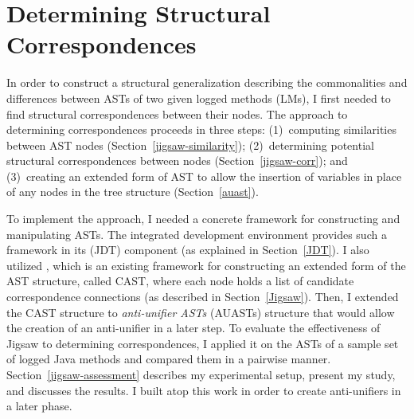 \chapter{Determining Structural Correspondences}\label{background2}
In order to construct a structural generalization describing the commonalities and differences between ASTs of two given logged methods (LMs), I first needed to find structural correspondences between their nodes. The approach to determining correspondences proceeds in three steps: (1)~computing similarities between AST nodes (Section~\ref{jigsaw-similarity}); (2)~determining potential structural correspondences between nodes (Section~\ref{jigsaw-corr}); and (3)~creating an extended form of AST to allow the insertion of variables in place of any nodes in the tree structure (Section~\ref{auast}).


To implement the approach, I needed a concrete framework for constructing and manipulating ASTs. The  integrated development environment provides such a framework in its  (JDT) component (as explained in Section~\ref{JDT}). I also utilized  \cite{2008:fse:cottrell}, which is an existing framework for constructing an extended form of the AST structure, called CAST, where each node holds a list of candidate correspondence connections (as described in Section~\ref{Jigsaw}). Then, I extended the CAST structure to \emph{anti-unifier ASTs} (AUASTs) structure that would allow the creation of an anti-unifier in a later step. To evaluate the effectiveness of Jigsaw to determining correspondences, I applied it on the ASTs of a sample set of logged Java methods and compared them in a pairwise manner. Section~\ref{jigsaw-assessment} describes my experimental setup, present my study, and discusses the results. I built atop this work in order to create anti-unifiers in a later phase.





